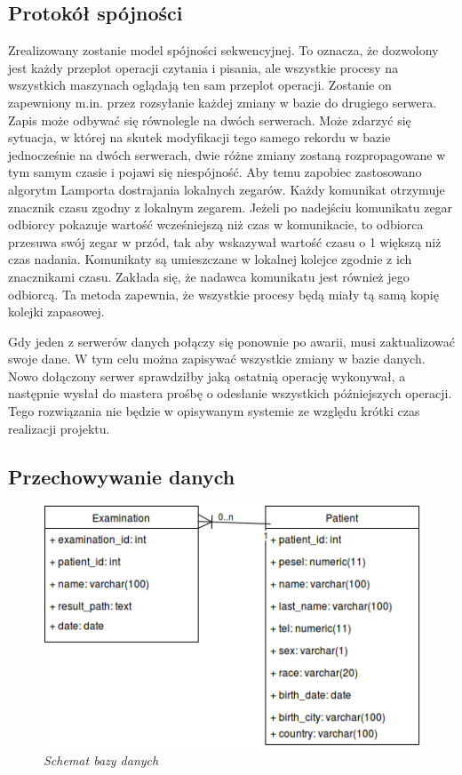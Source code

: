 \subsection{Protokół spójności}
Zrealizowany zostanie model spójności sekwencyjnej. To oznacza, że dozwolony jest każdy przeplot operacji czytania i pisania, ale wszystkie procesy na wszystkich maszynach oglądają ten sam przeplot operacji. Zostanie on zapewniony m.in. przez rozsyłanie każdej zmiany w bazie do drugiego serwera. Zapis może odbywać się równolegle na dwóch serwerach. Może zdarzyć się sytuacja, w której na skutek modyfikacji tego samego rekordu w bazie jednocześnie na dwóch serwerach, dwie różne zmiany zostaną rozpropagowane w tym samym czasie i pojawi się niespójność. Aby temu zapobiec zastosowano algorytm Lamporta dostrajania lokalnych zegarów. Każdy komunikat otrzymuje znacznik czasu zgodny z lokalnym zegarem. Jeżeli po nadejściu komunikatu zegar odbiorcy pokazuje wartość wcześniejszą niż czas w komunikacie, to odbiorca przesuwa swój zegar w przód, tak aby wskazywał wartość czasu o 1 większą niż czas nadania. Komunikaty są umieszczane w lokalnej kolejce zgodnie z ich znacznikami czasu. Zakłada się, że nadawca komunikatu jest również jego odbiorcą. Ta metoda zapewnia, że wszystkie procesy będą miały tą samą kopię kolejki zapasowej.

Gdy jeden z serwerów danych połączy się ponownie po awarii, musi zaktualizować swoje dane. W tym celu można zapisywać wszystkie zmiany w bazie danych. Nowo dołączony serwer sprawdziłby jaką ostatnią operację wykonywał, a następnie wysłał do mastera prośbę o odesłanie wszystkich późniejszych operacji. Tego rozwiązania nie będzie w opisywanym systemie ze względu krótki czas realizacji projektu.

\subsection{Przechowywanie danych}

\begin{figure}[!h]
    \begin{center}
    \includegraphics[angle=0,scale=0.7]{img/dbschema.png}
    \end{center}
    \caption{\em Schemat bazy danych}
    \label{fig:db_schema}
\end{figure}

